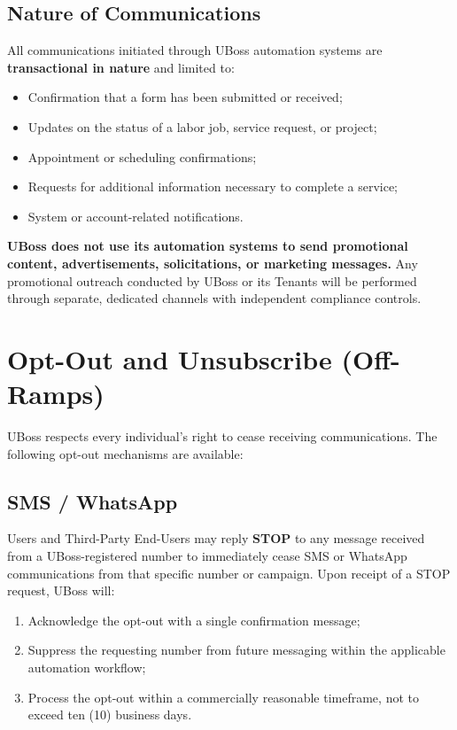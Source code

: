 \documentclass[11pt, letterpaper]{article}
\begin{document}
\subsection{Nature of Communications}

All communications initiated through UBoss automation systems are
\textbf{transactional in nature} and limited to:

\begin{itemize}
    \item Confirmation that a form has been submitted or received;
    \item Updates on the status of a labor job, service request, or project;
    \item Appointment or scheduling confirmations;
    \item Requests for additional information necessary to complete a service;
    \item System or account-related notifications.
\end{itemize}

\textbf{UBoss does not use its automation systems to send promotional content,
advertisements, solicitations, or marketing messages.} Any promotional outreach
conducted by UBoss or its Tenants will be performed through separate, dedicated
channels with independent compliance controls.

\section{Opt-Out and Unsubscribe (Off-Ramps)}

UBoss respects every individual's right to cease receiving communications. The
following opt-out mechanisms are available:

\subsection{SMS / WhatsApp}

Users and Third-Party End-Users may reply \textbf{STOP} to any message received from a
UBoss-registered number to immediately cease SMS or WhatsApp communications from that
specific number or campaign. Upon receipt of a STOP request, UBoss will:

\begin{enumerate}
    \item Acknowledge the opt-out with a single confirmation message;
    \item Suppress the requesting number from future messaging within the applicable
          automation workflow;
    \item Process the opt-out within a commercially reasonable timeframe, not to exceed
          ten (10) business days.
\end{enumerate}
\end{document}
